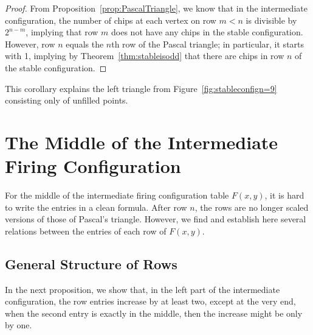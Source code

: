 \documentclass[11pt]{article}
\theoremstyle{definition}
\theoremstyle{remark}
\begin{document}
\begin{proof}
     From Proposition~\ref{prop:PascalTriangle}, we know that in the intermediate configuration, the number of chips at each vertex on row $m < n$ is divisible by $2^{n-m}$, implying that row $m$ does not have any chips in the stable configuration. However, row $n$ equals the $n$th row of the Pascal triangle; in particular, it starts with 1, implying by Theorem~\ref{thm:stableisodd} that there are chips in row $n$ of the stable configuration.
\end{proof}

This corollary explains the left triangle from Figure~\ref{fig:stableconfign=9} consisting only of unfilled points.

\section{The Middle of the Intermediate Firing Configuration}\label{sec:Med}

For the middle of the intermediate firing configuration table $F(x, y)$, it is hard to write the entries in a clean formula. After row $n$, the rows are no longer scaled versions of those of Pascal's triangle. However, we find and establish here several relations between the entries of each row of $F(x, y)$.

\subsection{General Structure of Rows}

In the next proposition, we show that, in the left part of the intermediate configuration, the row entries increase by at least two, except at the very end, when the second entry is exactly in the middle, then the increase might be only by one.
\end{document}
